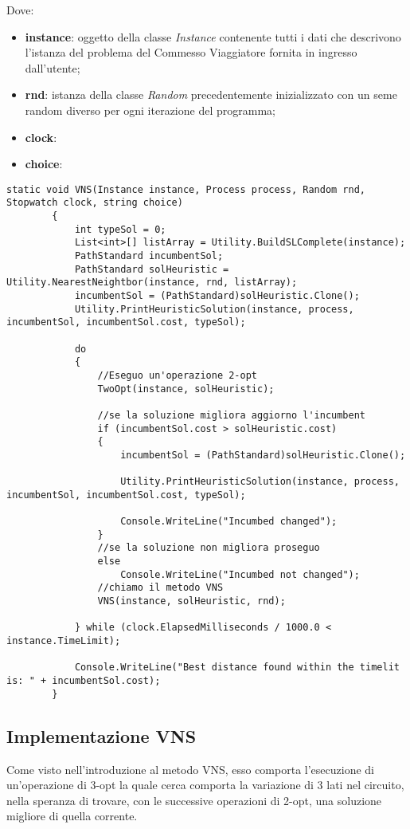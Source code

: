Dove:

\begin{itemize}
    \item \textbf{instance}: oggetto della classe \textit{Instance} contenente tutti i dati che descrivono l'istanza del problema del Commesso Viaggiatore fornita in ingresso dall'utente;
    \item \textbf{rnd}: istanza della classe \textit{Random} precedentemente inizializzato con un seme random diverso per ogni iterazione del programma;
    \item \textbf{clock}:
    \item \textbf{choice}:
\end{itemize}

\begin{lstlisting}
static void VNS(Instance instance, Process process, Random rnd, Stopwatch clock, string choice)
        {
            int typeSol = 0;
            List<int>[] listArray = Utility.BuildSLComplete(instance);
            PathStandard incumbentSol;
            PathStandard solHeuristic = Utility.NearestNeightbor(instance, rnd, listArray);
            incumbentSol = (PathStandard)solHeuristic.Clone();
            Utility.PrintHeuristicSolution(instance, process, incumbentSol, incumbentSol.cost, typeSol);

            do
            {
            	//Eseguo un'operazione 2-opt 
                TwoOpt(instance, solHeuristic);
				
				//se la soluzione migliora aggiorno l'incumbent
                if (incumbentSol.cost > solHeuristic.cost)
                {
                    incumbentSol = (PathStandard)solHeuristic.Clone();

                    Utility.PrintHeuristicSolution(instance, process, incumbentSol, incumbentSol.cost, typeSol);

                    Console.WriteLine("Incumbed changed");
                }
                //se la soluzione non migliora proseguo
                else
                    Console.WriteLine("Incumbed not changed");
				//chiamo il metodo VNS
                VNS(instance, solHeuristic, rnd);

            } while (clock.ElapsedMilliseconds / 1000.0 < instance.TimeLimit);

            Console.WriteLine("Best distance found within the timelit is: " + incumbentSol.cost);
        }
\end{lstlisting}

\subsection{Implementazione VNS}
Come visto nell'introduzione al metodo VNS, esso comporta l'esecuzione di un'operazione di 3-opt la quale cerca comporta la variazione di 3 lati nel circuito, nella speranza di trovare, con le successive operazioni di 2-opt, una soluzione migliore di quella corrente.

